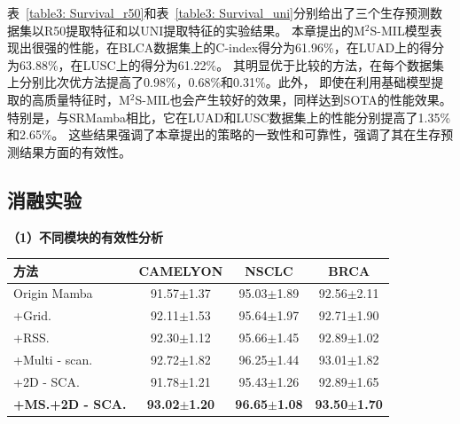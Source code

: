 表~\ref{table3: Survival_r50}和表~\ref{table3: Survival_uni}分别给出了三个生存预测数据集以R50提取特征和以UNI提取特征的实验结果。
本章提出的M$^2$S-MIL模型表现出很强的性能，在BLCA数据集上的C-index得分为61.96\%，在LUAD上的得分为63.88\%，在LUSC上的得分为61.22\%。
其明显优于比较的方法，在每个数据集上分别比次优方法提高了0.98\%，0.68\%和0.31\%。此外，
即使在利用基础模型提取的高质量特征时，M$^2$S-MIL也会产生较好的效果，同样达到SOTA的性能效果。
特别是，与SRMamba相比，它在LUAD和LUSC数据集上的性能分别提高了1.35\%和2.65\%。
这些结果强调了本章提出的策略的一致性和可靠性，强调了其在生存预测结果方面的有效性。


\subsection[\hspace{-2pt}消融实验]{{\heiti{} \hspace{-8pt}消融实验}}\label{section3: 消融实验}

\textbf{（1）不同模块的有效性分析}


\begin{table}[h!]
  \large    %
  \centering
  \begin{tabularx}{\textwidth}{lCCC}
    \toprule
    方法 & CAMELYON& NSCLC&BRCA\\ \midrule
    Origin Mamba &  91.57$\pm$1.37 & 95.03$\pm$1.89 & 92.56$\pm$2.11  \\
    +Grid.  & 92.11$\pm$1.53 &  95.64$\pm$1.97 & 92.71$\pm$1.90 \\
    +RSS.  & 92.30$\pm$1.12 &  95.66$\pm$1.45 & 92.89$\pm$1.02 \\
    +Multi - scan.  & 92.72$\pm$1.82 &  96.25$\pm$1.44 & 93.01$\pm$1.82 \\
    +2D - SCA.  &  91.78$\pm$1.21 & 95.43$\pm$1.26 & 92.89$\pm$1.65 \\
    \textbf{+MS.+2D - SCA.} &\textbf{93.02$\pm$1.20} &\textbf{96.65$\pm$1.08}  &\textbf{93.50$\pm$1.70} \\
    \bottomrule
  \end{tabularx}
  \label{table3: module ablation}
\end{table}

